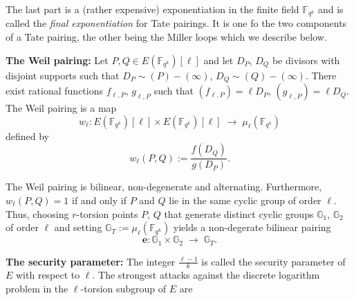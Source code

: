 \documentclass[11pt, lettersize, notitlepage, leqno, footskip=0.6cm]{article}
\newcommand{\bF}{\mathbb F}
\newcommand{\bFqk}{\mathbb{F}_{q^k}}
\newcommand{\divv}{\mathrm{div}}
\newcommand{\lra}{\longrightarrow}
\newcommand{\mb}{\mathbb}
\newcommand{\e}{\mathbf{e}}
\newcommand{\vs}{\vspace{-0.15cm}}
\newcommand{\noin}{\noindent}
\numberwithin{equation}{section}
\begin{document}
\noin The last part is a (rather expensive) exponentiation in the finite field $\bF _ {q^k}$ and is called the \textit{final exponentiation} for Tate pairings. It is one fo the two components of a Tate pairing, the other being the Miller loops which we describe below. 



    
\bigskip



\noin \textbf{The Weil pairing:} Let $P, Q \in E(\bFqk)[\ell]$ and let $D_P$, $D_Q$ be divisors with disjoint supports such that $D_P \sim (P) - (\infty) $, $D_Q \sim (Q) - (\infty) $. There exist rational functions $f_{\ell,P}$, $g_{\ell,P}$ such that $(f_{\ell,P}) = \ell D_P$, $(g_{\ell,P}) = \ell D_Q$. The Weil pairing is a map \vs $$w_{\ell}: E(\bFqk)[\ell]\times E(\bFqk)[\ell]\;\lra \; \mu_{\ell}(\bFqk) $$ defined by \vs $$w_{\ell}(P,Q):= \frac{f(D_Q)}{g(D_P)}. $$

The Weil pairing is bilinear, non-degenerate and alternating. Furthermore, $w_{\ell}(P,Q) = 1$ if and only if $P$ and $Q$ lie in the same cyclic group of order $\ell$. Thus, choosing $r$-torsion points $P$, $Q$ that generate distinct cyclic groups $\mb{G}_1$, $\mb{G}_2$ of order $\ell$ and setting $\mb{G}_T:= \mu_{\ell}(\bFqk)$ yields a non-degerate bilinear pairing \vs $$\e: \mb{G}_1\times\mb{G}_2 \;\lra\; \mb{G}_T .$$    



\begin{comment}

The (modified) Tate pairing is the map \vs $$\e: E[\ell]\times E[\ell] \lra \mu_{\ell}(\bF _{q^k})$$ defined as follows. For $P,Q \in E[\ell]$, let $f_P$ be any function such that $\divv(f_P) = n(P) - n(\infty)$.

Choose any point $R\in E[\ell]\setminus \{\infty, P, Q, P-Q \}$ and set $D_Q:= (Q+R)-(R)$. By construction, the divisors $D$ and $\divv(f_P)$ have disjoint supports. Now, we define \vs $$\e(P,Q):= f_P(D_Q)^{(q^k-1)/\ell} = \left( \frac{f_P(Q+R)}{f_P(R)}  \right)^ {(q^k-1)/\ell}.$$ The Tate-pairing is \textit{well-defined} in the sense that the value of $\e(P,Q)$ does not depend on the choice of $f_P$ or $R$. Furthermore, it is bilinear and non-degenerate.\\ \end{comment}

\noin \textbf{The security parameter:} The integer $\frac{\ell-1}{k}$ is called the security parameter of $E$ with respect to $\ell$. The strongest attacks against the discrete logarithm problem in the $\ell$-torsion subgroup of $E$ are 
\end{document}
